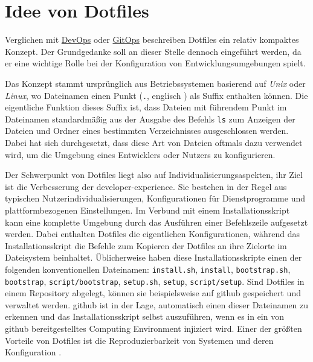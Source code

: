 \section{Idee von Dotfiles}
\label{sec:03-04_idea-of-dotfiles}

Verglichen mit \hyperref[sec:03-01_introduction-to-devops]{DevOps} oder \hyperref[sec:03-03_gitops-as-further-evolution]{GitOps} beschreiben Dotfiles ein relativ kompaktes Konzept. Der Grundgedanke soll an dieser Stelle dennoch eingeführt werden, da er eine wichtige Rolle bei der Konfiguration von Entwicklungsumgebungen spielt.

Das Konzept stammt ursprünglich aus Betriebssystemen basierend auf \textit{Unix} oder \textit{Linux}, wo Dateinamen einen Punkt (\texttt{.}, englisch ) als Suffix enthalten können. Die eigentliche Funktion dieses Suffix ist, dass Dateien mit führendem Punkt im Dateinamen standardmäßig aus der Ausgabe des Befehls \texttt{ls} zum Anzeigen der Dateien und Ordner eines bestimmten Verzeichnisses ausgeschlossen werden. Dabei hat sich durchgesetzt, dass diese Art von Dateien oftmals dazu verwendet wird, um die Umgebung eines Entwicklers oder Nutzers zu konfigurieren. \cite{029:Connecting-the-Dotfiles}

Der Schwerpunkt von Dotfiles liegt also auf Individualisierungsaspekten, ihr Ziel ist die Verbesserung der \Gls{developer-experience}. Sie bestehen in der Regel aus typischen Nutzerindividualisierungen, Konfigurationen für Dienstprogramme und plattformbezogenen Einstellungen. Im Verbund mit einem Installationsskript kann eine komplette Umgebung durch das Ausführen einer Befehlszeile aufgesetzt werden. Dabei enthalten Dotfiles die eigentlichen Konfigurationen, während das Installationsskript die Befehle zum Kopieren der Dotfiles an ihre Zielorte im Dateisystem beinhaltet. \cite{203:Dev-Environment-as-a-Code-with-DevContainers-Dotfiles-and-GitHub-Codespaces} Üblicherweise haben diese Installationsskripte einen der folgenden konventionellen Dateinamen: \texttt{install.sh}, \texttt{install}, \texttt{bootstrap.sh}, \texttt{bootstrap}, \texttt{script/bootstrap}, \texttt{setup.sh}, \texttt{setup}, \texttt{script/setup}. Sind Dotfiles in einem Repository abgelegt, können sie beispielsweise auf \Gls{github} gespeichert und verwaltet werden. \Gls{github} ist in der Lage, automatisch einen dieser Dateinamen zu erkennen und das Installationsskript selbst auszuführen, wenn es in ein von \Gls{github} bereitgestelltes Computing Environment injiziert wird. \cite{304:Personalizing-GitHub-Codespaces-for-your-Account} Einer der größten Vorteile von Dotfiles ist die Reproduzierbarkeit von Systemen und deren Konfiguration \cite{029:Connecting-the-Dotfiles}.


